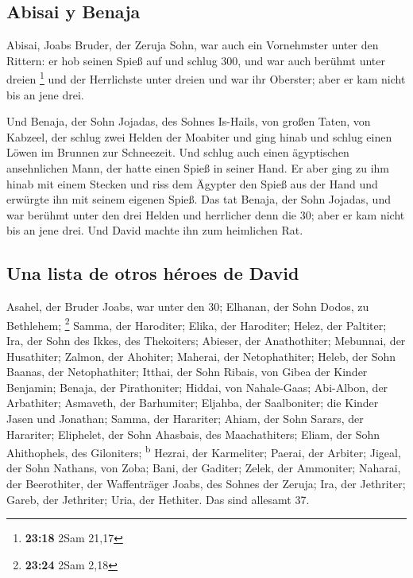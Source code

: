\hypertarget{abisai-y-benaja}{%
\subsection{Abisai y Benaja}\label{abisai-y-benaja}}

 Abisai, Joabs Bruder, der Zeruja Sohn, war auch ein
Vornehmster unter den Rittern: er hob seinen Spieß auf und schlug 300,
und war auch berühmt unter dreien \footnote{\textbf{23:18} 2Sam 21,17}
 und der Herrlichste unter dreien und war ihr Oberster;
aber er kam nicht bis an jene drei.

 Und Benaja, der Sohn Jojadas, des Sohnes Is-Hails, von
großen Taten, von Kabzeel, der schlug zwei Helden der Moabiter und ging
hinab und schlug einen Löwen im Brunnen zur Schneezeit. 
Und schlug auch einen ägyptischen ansehnlichen Mann, der hatte einen
Spieß in seiner Hand. Er aber ging zu ihm hinab mit einem Stecken und
riss dem Ägypter den Spieß aus der Hand und erwürgte ihn mit seinem
eigenen Spieß.  Das tat Benaja, der Sohn Jojadas, und war
berühmt unter den drei Helden  und herrlicher denn die
30; aber er kam nicht bis an jene drei. Und David machte ihn zum
heimlichen Rat.

\hypertarget{una-lista-de-otros-huxe9roes-de-david}{%
\subsection{Una lista de otros héroes de
David}\label{una-lista-de-otros-huxe9roes-de-david}}

 Asahel, der Bruder Joabs, war unter den 30; Elhanan, der
Sohn Dodos, zu Bethlehem; \footnote{\textbf{23:24} 2Sam 2,18}
 Samma, der Haroditer; Elika, der Haroditer;
 Helez, der Paltiter; Ira, der Sohn des Ikkes, des
Thekoiters;  Abieser, der Anathothiter; Mebunnai, der
Husathiter;  Zalmon, der Ahohiter; Maherai, der
Netophathiter;  Heleb, der Sohn Baanas, der
Netophathiter; Itthai, der Sohn Ribais, von Gibea der Kinder Benjamin;
 Benaja, der Pirathoniter; Hiddai, von Nahale-Gaas;
 Abi-Albon, der Arbathiter; Asmaveth, der Barhumiter;
 Eljahba, der Saalboniter; die Kinder Jasen und Jonathan;
 Samma, der Harariter; Ahiam, der Sohn Sarars, der
Harariter;  Eliphelet, der Sohn Ahasbais, des
Maachathiters; Eliam, der Sohn Ahithophels, des Giloniters;
\textsuperscript{b}  Hezrai, der Karmeliter; Paerai, der
Arbiter;  Jigeal, der Sohn Nathans, von Zoba; Bani, der
Gaditer;  Zelek, der Ammoniter; Naharai, der Beerothiter,
der Waffenträger Joabs, des Sohnes der Zeruja;  Ira, der
Jethriter; Gareb, der Jethriter;  Uria, der Hethiter. Das
sind allesamt 37.

